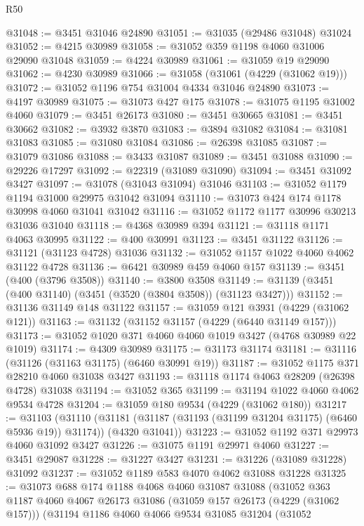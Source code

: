 \begin{lexlean}{R50}
\begin{coremodule}
@31048 := @3451 @31046 @24890
@31051 := @31035 (@29486 @31048) @31024
@31052 := @4215 @30989
@31058 := @31052 @359 @1198 @4060 @31006 @29090 @31048
@31059 := @4224 @30989
@31061 := @31059 @19 @29090
@31062 := @4230 @30989
@31066 := @31058 (@31061 (@4229 (@31062 @19)))
@31072 := @31052 @1196 @754 @31004 @4334 @31046 @24890
@31073 := @4197 @30989
@31075 := @31073 @427 @175
@31078 := @31075 @1195 @31002 @4060
@31079 := @3451 @26173
@31080 := @3451 @30665
@31081 := @3451 @30662
@31082 := @3932 @3870
@31083 := @3894 @31082
@31084 := @31081 @31083
@31085 := @31080 @31084
@31086 := @26398 @31085
@31087 := @31079 @31086
@31088 := @3433 @31087
@31089 := @3451 @31088
@31090 := @29226 @17297
@31092 := @22319 (@31089 @31090)
@31094 := @3451 @31092 @3427
@31097 := @31078 (@31043 @31094) @31046
@31103 := @31052 @1179 @1194 @31000 @29975 @31042 @31094
@31110 := @31073 @424 @174 @1178 @30998 @4060 @31041 @31042
@31116 := @31052 @1172 @1177 @30996 @30213 @31036 @31040
@31118 := @4368 @30989 @394
@31121 := @31118 @1171 @4063 @30995
@31122 := @400 @30991
@31123 := @3451 @31122
@31126 := @31121 (@31123 @4728) @31036
@31132 := @31052 @1157 @1022 @4060 @4062 @31122 @4728
@31136 := @6421 @30989 @459 @4060 @157
@31139 := @3451 (@400 (@3796 @3508))
@31140 := @3800 @3508
@31149 := @31139 (@3451 (@400 @31140) (@3451 (@3520 (@3804 @3508)) (@31123 @3427)))
@31152 := @31136 @31149 @148 @31122
@31157 := @31059 @121 @3931 (@4229 (@31062 @121))
@31163 := @31132 (@31152 @31157 (@4229 (@6440 @31149 @157)))
@31173 := @31052 @1020 @371 @4060 @4060 @1019 @3427 (@4768 @30989 @22 @1019)
@31174 := @4309 @30989
@31175 := @31173 @31174
@31181 := @31116 (@31126 (@31163 @31175) (@6460 @30991 @19))
@31187 := @31052 @1175 @371 @28210 @4060 @31038 @3427
@31193 := @31118 @1174 @4063 @28209 (@26398 @4728) @31038
@31194 := @31052 @365
@31199 := @31194 @1022 @4060 @4062 @9534 @4728
@31204 := @31059 @180 @9534 (@4229 (@31062 @180))
@31217 := @31103
    (@31110
      (@31181 (@31187 (@31193 (@31199 @31204 @31175) (@6460 @5936 @19)) @31174))
      (@4320 @31041))
@31223 := @31052 @1192 @371 @29973 @4060 @31092 @3427
@31226 := @31075 @1191 @29971 @4060
@31227 := @3451 @29087
@31228 := @31227 @3427
@31231 := @31226 (@31089 @31228) @31092
@31237 := @31052 @1189 @583 @4070 @4062 @31088 @31228
@31325 := @31073
    @688
    @174
    @1188
    @4068
    @4060
    @31087
    @31088
    (@31052
      @363
      @1187
      @4060
      @4067
      @26173
      @31086
      (@31059 @157 @26173 (@4229 (@31062 @157)))
      (@31194
        @1186
        @4060
        @4066
        @9534
        @31085
        @31204
        (@31052

\end{coremodule}
\end{lexlean}
